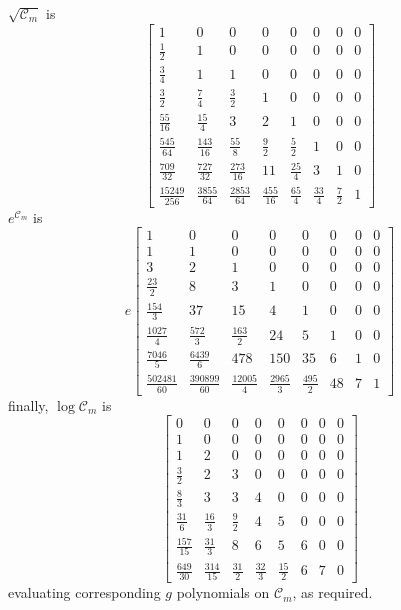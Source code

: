$\sqrt{\mathcal{C}_{m}}$ is
\begin{displaymath}
\left[\begin{matrix}1 & 0 & 0 & 0 & 0 & 0 & 0 & 0\\\frac{1}{2} & 1 & 0 & 0 & 0 & 0 & 0 & 0\\\frac{3}{4} & 1 & 1 & 0 & 0 & 0 & 0 & 0\\\frac{3}{2} & \frac{7}{4} & \frac{3}{2} & 1 & 0 & 0 & 0 & 0\\\frac{55}{16} & \frac{15}{4} & 3 & 2 & 1 & 0 & 0 & 0\\\frac{545}{64} & \frac{143}{16} & \frac{55}{8} & \frac{9}{2} & \frac{5}{2} & 1 & 0 & 0\\\frac{709}{32} & \frac{727}{32} & \frac{273}{16} & 11 & \frac{25}{4} & 3 & 1 & 0\\\frac{15249}{256} & \frac{3855}{64} & \frac{2853}{64} & \frac{455}{16} & \frac{65}{4} & \frac{33}{4} & \frac{7}{2} & 1\end{matrix}\right]
\end{displaymath}
$e^{\mathcal{C}_{m}}$ is
\begin{displaymath}
e \left[\begin{matrix}1 & 0 & 0 & 0 & 0 & 0 & 0 & 0\\1 & 1 & 0 & 0 & 0 & 0 & 0 & 0\\3 & 2 & 1 & 0 & 0 & 0 & 0 & 0\\\frac{23}{2} & 8 & 3 & 1 & 0 & 0 & 0 & 0\\\frac{154}{3} & 37 & 15 & 4 & 1 & 0 & 0 & 0\\\frac{1027}{4} & \frac{572}{3} & \frac{163}{2} & 24 & 5 & 1 & 0 & 0\\\frac{7046}{5} & \frac{6439}{6} & 478 & 150 & 35 & 6 & 1 & 0\\\frac{502481}{60} & \frac{390899}{60} & \frac{12005}{4} & \frac{2965}{3} & \frac{495}{2} & 48 & 7 & 1\end{matrix}\right]
\end{displaymath}
finally, $\log{\mathcal{C}_{m}}$ is
\begin{displaymath}
\left[\begin{matrix}0 & 0 & 0 & 0 & 0 & 0 & 0 & 0\\1 & 0 & 0 & 0 & 0 & 0 & 0 & 0\\1 & 2 & 0 & 0 & 0 & 0 & 0 & 0\\\frac{3}{2} & 2 & 3 & 0 & 0 & 0 & 0 & 0\\\frac{8}{3} & 3 & 3 & 4 & 0 & 0 & 0 & 0\\\frac{31}{6} & \frac{16}{3} & \frac{9}{2} & 4 & 5 & 0 & 0 & 0\\\frac{157}{15} & \frac{31}{3} & 8 & 6 & 5 & 6 & 0 & 0\\\frac{649}{30} & \frac{314}{15} & \frac{31}{2} & \frac{32}{3} & \frac{15}{2} & 6 & 7 & 0\end{matrix}\right]
\end{displaymath}
evaluating corresponding $g$ polynomials on $\mathcal{C}_{m}$, as required.

